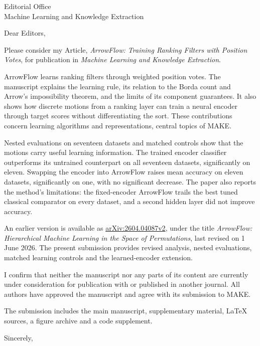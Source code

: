 \documentclass[11pt]{letter}
\date{27 September 2026}
\begin{document}
\begin{letter}{Editorial Office\\Machine Learning and Knowledge Extraction}
\opening{Dear Editors,}

Please consider my Article, \emph{ArrowFlow: Training Ranking Filters with Position Votes}, for publication in \emph{Machine Learning and Knowledge Extraction}.

ArrowFlow learns ranking filters through weighted position votes. The manuscript explains the learning rule, its relation to the Borda count and Arrow's impossibility theorem, and the limits of its component guarantees. It also shows how discrete motions from a ranking layer can train a neural encoder through target scores without differentiating the sort. These contributions concern learning algorithms and representations, central topics of MAKE.

Nested evaluations on seventeen datasets and matched controls show that the motions carry useful learning information. The trained encoder classifier outperforms its untrained counterpart on all seventeen datasets, significantly on eleven. Swapping the encoder into ArrowFlow raises mean accuracy on eleven datasets, significantly on one, with no significant decrease. The paper also reports the method's limitations: the fixed-encoder ArrowFlow trails the best tuned classical comparator on every dataset, and a second hidden layer did not improve accuracy.

An earlier version is available as \href{https://arxiv.org/abs/2604.04087v2}{arXiv:2604.04087v2}, under the title \emph{ArrowFlow: Hierarchical Machine Learning in the Space of Permutations}, last revised on 1 June 2026. The present submission provides revised analysis, nested evaluations, matched learning controls and the learned-encoder extension.

I confirm that neither the manuscript nor any parts of its content are currently under consideration for publication with or published in another journal. All authors have approved the manuscript and agree with its submission to MAKE.

The submission includes the main manuscript, supplementary material, LaTeX sources, a figure archive and a code supplement.

\closing{Sincerely,}
\end{letter}
\end{document}
